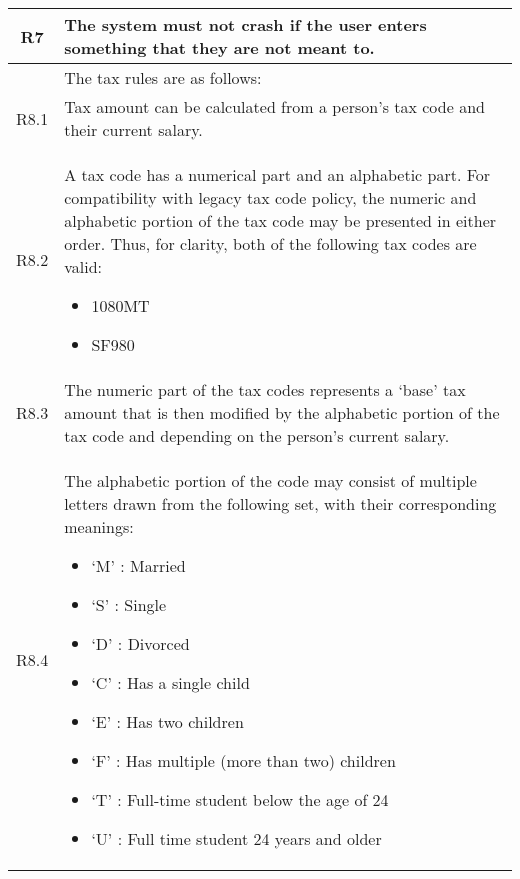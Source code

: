 \begin{table}[H]
\begin{tabularx}{\textwidth}{| c | X |}
    \label{req:r7}
    R7 & The system must not crash if the user enters something that they are not meant to. \\
    \hline %
    & The tax rules are as follows:\\
    \hline %
    \label{req:r8-1}
    R8.1 & Tax amount can be calculated from a person’s tax code and their current salary. \\
    \hline %
    R8.2 & A tax code has a numerical part and an alphabetic part. For compatibility with legacy
    tax code policy, the numeric and alphabetic portion of the tax code may be presented in either order. Thus, for clarity, both of the following tax codes are valid:
    \begin{itemize}[itemsep=\tableitemsep, leftmargin=\tableleftsep]
    \item 1080MT
    \item SF980
\end{itemize}
    \\
    \hline %
    R8.3 & The numeric part of the tax codes represents a ‘base’ tax amount that is then modified by the alphabetic portion of the tax code and depending on the person’s current salary. \\
    \hline %
    R8.4 & The alphabetic portion of the code may consist of multiple letters drawn from the following set, with their corresponding meanings: 
    \begin{itemize}[itemsep=\tableitemsep, leftmargin=\tableleftsep]
    \item ‘M’ : Married
    \item ‘S’ : Single
    \item ‘D’ : Divorced
    \item ‘C’ : Has a single child
    \item ‘E’ : Has two children
    \item ‘F’ : Has multiple (more than two) children 
    \item ‘T’ : Full-time student below the age of 24 
    \item ‘U’ : Full time student 24 years and older
\end{itemize}
    \\
    \hline %
    \end{tabularx}
    \end{table}

